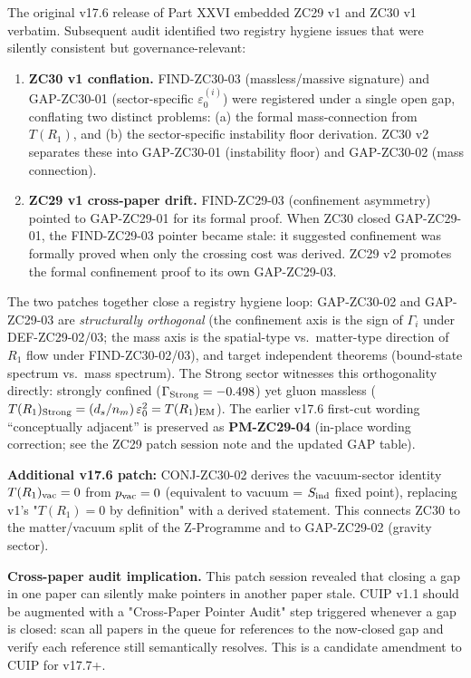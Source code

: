 \documentclass[12pt, a4paper]{article}
\begin{document}
\begin{formalbox}[title={v17.6 Patch Summary --- ZC29 v2 + ZC30 v2}]
The original v17.6 release of Part XXVI embedded ZC29 v1 and
ZC30 v1 verbatim. Subsequent audit identified two registry
hygiene issues that were silently consistent but governance-relevant:

\begin{enumerate}[leftmargin=*, noitemsep]
  \item \textbf{ZC30 v1 conflation.} FIND-ZC30-03
    (massless/massive signature) and GAP-ZC30-01
    (sector-specific $\varepsilon_0^{(i)}$) were registered
    under a single open gap, conflating two distinct problems:
    (a) the formal mass-connection from $T(R_1)$, and
    (b) the sector-specific instability floor derivation.
    ZC30 v2 separates these into GAP-ZC30-01 (instability
    floor) and GAP-ZC30-02 (mass connection).
  \item \textbf{ZC29 v1 cross-paper drift.} FIND-ZC29-03
    (confinement asymmetry) pointed to GAP-ZC29-01 for its
    formal proof. When ZC30 closed GAP-ZC29-01, the FIND-ZC29-03
    pointer became stale: it suggested confinement was formally
    proved when only the crossing cost was derived. ZC29 v2
    promotes the formal confinement proof to its own
    GAP-ZC29-03.
\end{enumerate}

The two patches together close a registry hygiene loop:
GAP-ZC30-02 and GAP-ZC29-03 are \emph{structurally
orthogonal} (the confinement axis is the sign of $\Gamma_i$
under DEF-ZC29-02/03; the mass axis is the spatial-type
vs.\ matter-type direction of $R_1$ flow under
FIND-ZC30-02/03), and target independent theorems
(bound-state spectrum vs.\ mass spectrum). The Strong
sector witnesses this orthogonality directly: strongly
confined ($\Gamma_{\rm Strong} = -0.498$) yet gluon
massless ($T(R_1)_{\rm Strong} = (d_s/n_m)\,\varepsilon_0^2
= T(R_1)_{\rm EM}$). The earlier v17.6 first-cut wording
``conceptually adjacent'' is preserved as
\textbf{PM-ZC29-04} (in-place wording correction; see the
ZC29 patch session note and the updated GAP table).

\textbf{Additional v17.6 patch:} CONJ-ZC30-02 derives the
vacuum-sector identity $T(R_1)_{\rm vac} = 0$ from
$p_{\rm vac} = 0$ (equivalent to vacuum = $S_{\rm ind}$
fixed point), replacing v1's "$T(R_1) = 0$ by definition"
with a derived statement. This connects ZC30 to the
matter/vacuum split of the Z-Programme and to
GAP-ZC29-02 (gravity sector).

\textbf{Cross-paper audit implication.}
This patch session revealed that closing a gap in one paper
can silently make pointers in another paper stale. CUIP v1.1
should be augmented with a "Cross-Paper Pointer Audit" step
triggered whenever a gap is closed: scan all papers in the
queue for references to the now-closed gap and verify each
reference still semantically resolves. This is a candidate
amendment to CUIP for v17.7+.
\end{formalbox}
\end{document}
